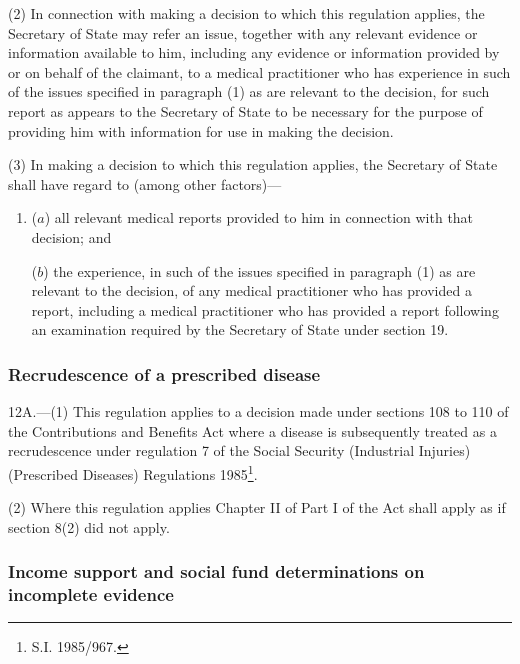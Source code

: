 \documentclass[12pt,a4paper]{article}
\begin{document}
(2) In connection with making a decision to which this regulation applies, the Secretary of State may refer an issue, together with any relevant evidence or information available to him, including any evidence or information provided by or on behalf of the claimant, to a medical practitioner who has experience in such of the issues specified in paragraph (1) as are relevant to the decision, for such report as appears to the Secretary of State to be necessary for the purpose of providing him with information for use in making the decision.

(3) In making a decision to which this regulation applies, the Secretary of State shall have regard to (among other factors)—
\begin{enumerate}\item[]
($a$) all relevant medical reports provided to him in connection with that decision; and

($b$) the experience, in such of the issues specified in paragraph (1) as are relevant to the decision, of any medical practitioner who has provided a report, including a medical practitioner who has provided a report following an examination required by the Secretary of State under section 19.
\end{enumerate}

\subsubsection[12A. Recrudescence of a prescribed disease]{Recrudescence of a prescribed disease}

12A.---(1)  This regulation applies to a decision made under sections 108 to 110 of the Contributions and Benefits Act where a disease is subsequently treated as a recrudescence under regulation 7 of the Social Security (Industrial Injuries) (Prescribed Diseases) Regulations 1985\footnote{\frenchspacing S.I. 1985/967.}.

(2) Where this regulation applies Chapter II of Part I of the Act shall apply as if section 8(2) did not apply.


\subsubsection[13. Income support and social fund determinations on incomplete evidence]{\sloppy Income support and social fund determinations on incomplete evidence}
\end{document}
